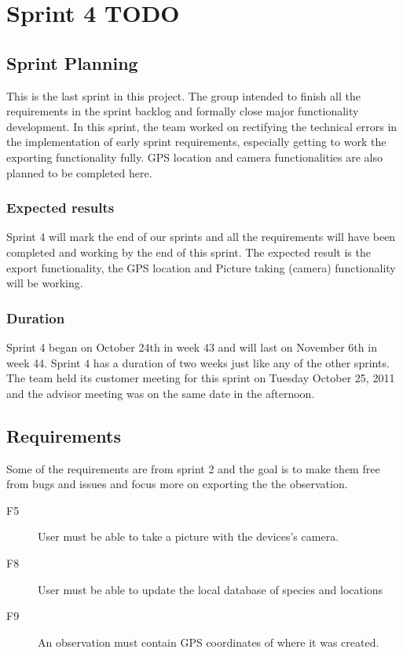 \section{Sprint 4 TODO}

	\subsection{Sprint Planning}
This is the last sprint in this project. The group intended to finish all the requirements in the sprint backlog and formally close major functionality development. In this sprint, the team worked on rectifying the technical errors in the implementation of early sprint requirements, especially getting to work the exporting functionality fully. GPS location and camera functionalities are also planned to be completed here.
	\subsubsection{Expected results}
Sprint 4 will mark the end of our sprints and all the requirements will have been completed and working by the end of this sprint. The expected result is the export functionality, the GPS location and Picture taking (camera) functionality will be working.	
	\subsubsection{Duration}
Sprint 4 began on October 24th in week 43 and will last on November 6th in week 44. Sprint 4 has a duration of two weeks just like any of the other sprints. The team held its customer meeting for this sprint on Tuesday October 25, 2011 and the advisor meeting was on the same date in the afternoon.
	\subsection{Requirements}
Some of the requirements are from sprint 2 and the goal is to make them free from bugs and issues and focus more on exporting the the observation.
\begin{description}

\item[F5] User must be able to take a picture with the devices's camera.

\item[F8] User must be able to update the local database of species and locations

\item[F9] An observation must contain GPS coordinates of where it was created.

\end{description}
